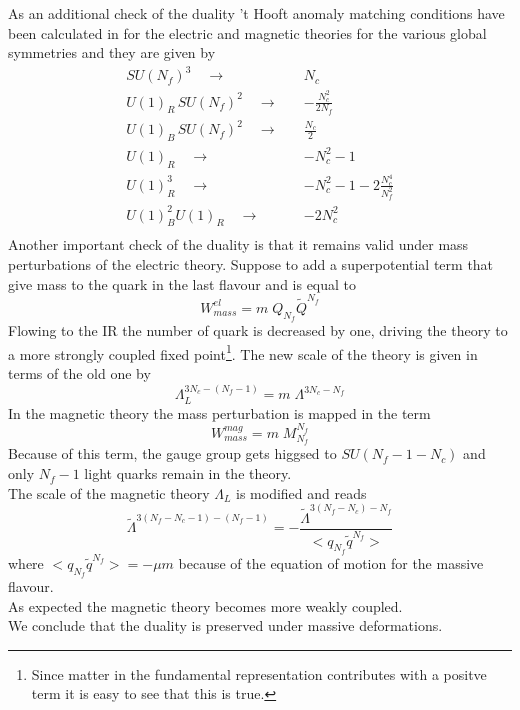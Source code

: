As an additional check of the duality 't Hooft anomaly matching conditions have been calculated  in \cite{Seiberg:1994pq} for the electric and magnetic theories for the various global symmetries and they are given by
\begin{equation}
\begin{aligned}
SU(N_f)^3 \quad \longrightarrow \quad   & N_c \\
U(1)_R\, SU(N_f)^2 \quad \longrightarrow \quad  & -\frac{N_c^2}{2 N_f} \\
U(1)_B\, SU(N_f)^2 \quad \longrightarrow \quad  & \frac{N_c}{2} \\
U(1)_R \quad \longrightarrow \quad  & -N_c^2 - 1 \\
U(1)_R^3 \quad \longrightarrow \quad  & -N_c^2 - 1 - 2 \frac{N_c^4}{N_f^2} \\
U(1)_B^2 U(1)_R \quad \longrightarrow \quad  & - 2 N_c^2 \\
\end{aligned}
\end{equation}
Another important check of the duality is that it remains valid under mass perturbations of the electric theory.
Suppose to add a superpotential term that give mass to the quark in the last flavour and is equal to
\begin{equation}
	W_{mass}^{el} = m \; Q_{N_f} \tilde{Q}^{N_f}
\end{equation}
Flowing to the IR the number of quark is decreased by one, driving the theory to a more strongly coupled fixed point\footnote{Since matter in the fundamental representation contributes with a positve term it is easy to see that this is true.}.
The new scale of the theory is given in terms of the old one by
\begin{equation}
 \Lambda_{L}^{3 N_c - (N_f - 1)} = m \; \Lambda^{3 N_c - N_f}
\end{equation}
In the magnetic theory the mass perturbation is mapped in the  term
\begin{equation}
W_{mass}^{mag} = m \; M_{N_f}^{N_f}
\end{equation}
Because of this term, the gauge group gets higgsed to $SU(N_f-1 - N_c)$ and only $N_f -1$ light quarks remain in the theory. \\
The scale of the magnetic theory $\Lambda_L$ is modified and reads
\begin{equation}
\tilde{\Lambda}^{3(N_f - N_c -1) - (N_f -1)} = 
- \frac{
	\tilde{\Lambda}^{3 (N_f - N_c) - N_f}	
	}
	{
	< q_{N_f} \tilde{q}^{N_f}		>
	}
\end{equation}
where $< q_{N_f} \tilde{q}^{N_f}> = - \mu m $ because of the equation of motion for the massive flavour. \\
As expected the magnetic theory becomes more weakly coupled.\\
We conclude that the duality is preserved under massive deformations.  